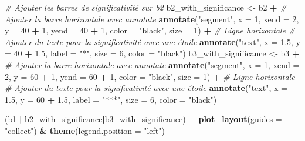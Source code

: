 \documentclass[
  french,
]{article}
\newenvironment{Shaded}{\begin{snugshade}}{\end{snugshade}}
\newcommand{\AttributeTok}[1]{\textcolor[rgb]{0.13,0.29,0.53}{#1}}
\newcommand{\CommentTok}[1]{\textcolor[rgb]{0.56,0.35,0.01}{\textit{#1}}}
\newcommand{\DecValTok}[1]{\textcolor[rgb]{0.00,0.00,0.81}{#1}}
\newcommand{\FloatTok}[1]{\textcolor[rgb]{0.00,0.00,0.81}{#1}}
\newcommand{\FunctionTok}[1]{\textcolor[rgb]{0.13,0.29,0.53}{\textbf{#1}}}
\newcommand{\NormalTok}[1]{#1}
\newcommand{\OtherTok}[1]{\textcolor[rgb]{0.56,0.35,0.01}{#1}}
\newcommand{\SpecialCharTok}[1]{\textcolor[rgb]{0.81,0.36,0.00}{\textbf{#1}}}
\newcommand{\StringTok}[1]{\textcolor[rgb]{0.31,0.60,0.02}{#1}}
\begin{document}
\begin{Shaded}
\begin{Highlighting}[]
\CommentTok{\# Ajouter les barres de significativité sur b2}
\NormalTok{b2\_with\_significance }\OtherTok{\textless{}{-}}\NormalTok{ b2 }\SpecialCharTok{+}
  \CommentTok{\# Ajouter la barre horizontale avec annotate}
  \FunctionTok{annotate}\NormalTok{(}\StringTok{"segment"}\NormalTok{, }\AttributeTok{x =} \DecValTok{1}\NormalTok{, }\AttributeTok{xend =} \DecValTok{2}\NormalTok{, }\AttributeTok{y =} \DecValTok{40} \SpecialCharTok{+} \DecValTok{1}\NormalTok{, }\AttributeTok{yend =} \DecValTok{40} \SpecialCharTok{+} \DecValTok{1}\NormalTok{, }
           \AttributeTok{color =} \StringTok{"black"}\NormalTok{, }\AttributeTok{size =} \DecValTok{1}\NormalTok{) }\SpecialCharTok{+}  \CommentTok{\# Ligne horizontale}
  \CommentTok{\# Ajouter du texte pour la significativité avec une étoile}
  \FunctionTok{annotate}\NormalTok{(}\StringTok{"text"}\NormalTok{, }\AttributeTok{x =} \FloatTok{1.5}\NormalTok{, }\AttributeTok{y =} \DecValTok{40} \SpecialCharTok{+} \FloatTok{1.5}\NormalTok{, }\AttributeTok{label =} \StringTok{"*"}\NormalTok{, }\AttributeTok{size =} \DecValTok{6}\NormalTok{, }\AttributeTok{color =} \StringTok{"black"}\NormalTok{)}
\NormalTok{b3\_with\_significance }\OtherTok{\textless{}{-}}\NormalTok{ b3 }\SpecialCharTok{+}
  \CommentTok{\# Ajouter la barre horizontale avec annotate}
  \FunctionTok{annotate}\NormalTok{(}\StringTok{"segment"}\NormalTok{, }\AttributeTok{x =} \DecValTok{1}\NormalTok{, }\AttributeTok{xend =} \DecValTok{2}\NormalTok{, }\AttributeTok{y =} \DecValTok{60} \SpecialCharTok{+} \DecValTok{1}\NormalTok{, }\AttributeTok{yend =} \DecValTok{60} \SpecialCharTok{+} \DecValTok{1}\NormalTok{, }
           \AttributeTok{color =} \StringTok{"black"}\NormalTok{, }\AttributeTok{size =} \DecValTok{1}\NormalTok{) }\SpecialCharTok{+}  \CommentTok{\# Ligne horizontale}
  \CommentTok{\# Ajouter du texte pour la significativité avec une étoile}
  \FunctionTok{annotate}\NormalTok{(}\StringTok{"text"}\NormalTok{, }\AttributeTok{x =} \FloatTok{1.5}\NormalTok{, }\AttributeTok{y =} \DecValTok{60} \SpecialCharTok{+} \FloatTok{1.5}\NormalTok{, }\AttributeTok{label =} \StringTok{"***"}\NormalTok{, }\AttributeTok{size =} \DecValTok{6}\NormalTok{, }\AttributeTok{color =} \StringTok{"black"}\NormalTok{)}

\NormalTok{(b1 }\SpecialCharTok{|}\NormalTok{ b2\_with\_significance}\SpecialCharTok{|}\NormalTok{b3\_with\_significance) }\SpecialCharTok{+} 
  \FunctionTok{plot\_layout}\NormalTok{(}\AttributeTok{guides =} \StringTok{"collect"}\NormalTok{) }\SpecialCharTok{\&} 
  \FunctionTok{theme}\NormalTok{(}\AttributeTok{legend.position =} \StringTok{"left"}\NormalTok{)}
\end{Highlighting}
\end{Shaded}
\end{document}
